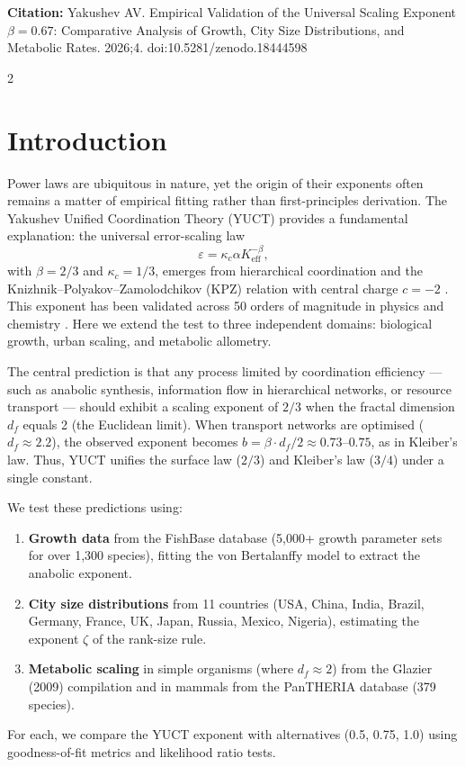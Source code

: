 \documentclass[11pt,a4paper]{article}
\newcommand{\eps}{\varepsilon}
\newcommand{\kappac}{\kappa_c}
\newcommand{\Keff}{K_{\mathrm{eff}}}
\newcommand{\betaf}{\beta}
\newcommand{\df}{d_f}
\begin{document}
	\vspace{0.1cm}
	\noindent
	{\color{darkblue}\textbf{Citation:}} Yakushev AV. Empirical Validation of the Universal Scaling Exponent \(\beta = 0.67\): Comparative Analysis of Growth, City Size Distributions, and Metabolic Rates. 2026;4. doi:10.5281/zenodo.18444598
	
	\vspace{0.4cm}
	\vspace*{-\baselineskip}
	\begin{multicols}{2}
		
		\section{Introduction}
		
		Power laws are ubiquitous in nature, yet the origin of their exponents often remains a matter of empirical fitting rather than first-principles derivation. The Yakushev Unified Coordination Theory (YUCT) provides a fundamental explanation: the universal error-scaling law
		\[
		\eps = \kappac \alpha \Keff^{-\betaf},
		\]
		with \(\betaf = 2/3\) and \(\kappac = 1/3\), emerges from hierarchical coordination and the Knizhnik–Polyakov–Zamolodchikov (KPZ) relation with central charge \(c = -2\) \cite{AppendixY, AppendixL}. This exponent has been validated across 50 orders of magnitude in physics and chemistry \cite{AppendixC, AppendixG}. Here we extend the test to three independent domains: biological growth, urban scaling, and metabolic allometry.
		
		The central prediction is that any process limited by coordination efficiency — such as anabolic synthesis, information flow in hierarchical networks, or resource transport — should exhibit a scaling exponent of \(2/3\) when the fractal dimension \(\df\) equals 2 (the Euclidean limit). When transport networks are optimised (\(\df \approx 2.2\)), the observed exponent becomes \(b = \betaf \cdot \df/2 \approx 0.73\)–\(0.75\), as in Kleiber's law. Thus, YUCT unifies the surface law (\(2/3\)) and Kleiber's law (\(3/4\)) under a single constant.
		
		We test these predictions using:
		\begin{enumerate}
			\item \textbf{Growth data} from the FishBase database (5,000+ growth parameter sets for over 1,300 species), fitting the von Bertalanffy model to extract the anabolic exponent.
			\item \textbf{City size distributions} from 11 countries (USA, China, India, Brazil, Germany, France, UK, Japan, Russia, Mexico, Nigeria), estimating the exponent \(\zeta\) of the rank-size rule.
			\item \textbf{Metabolic scaling} in simple organisms (where \(\df \approx 2\)) from the Glazier (2009) compilation and in mammals from the PanTHERIA database (379 species).
		\end{enumerate}
		For each, we compare the YUCT exponent with alternatives (0.5, 0.75, 1.0) using goodness-of-fit metrics and likelihood ratio tests.
		

\end{multicols}
\end{document}

